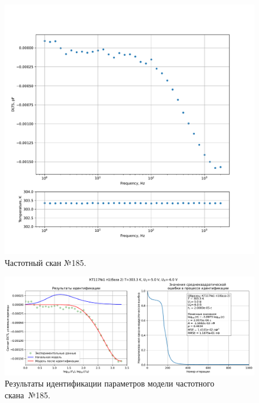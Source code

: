 \begin{figure}[!ht]
    \centering
    \includegraphics[width=1\textwidth]{../plots/КТ117№1_п1(база 2)_2500Гц-1Гц_1пФ_+30С_-5В-6В_20мВ_20мкс_шаг_0,1.pdf}
    \caption{Частотный скан №185.}
    \label{pic:frequency_scan_185}
\end{figure}

\begin{figure}[!ht]
    \centering
    \includegraphics[width=1\textwidth]{../plots/КТ117№1_п1(база 2)_2500Гц-1Гц_1пФ_+30С_-5В-6В_20мВ_20мкс_шаг_0,1_model.pdf}
    \caption{Результаты идентификации параметров модели частотного скана~№185.}
    \label{pic:frequency_scan_model185}
\end{figure}

\pagebreak


